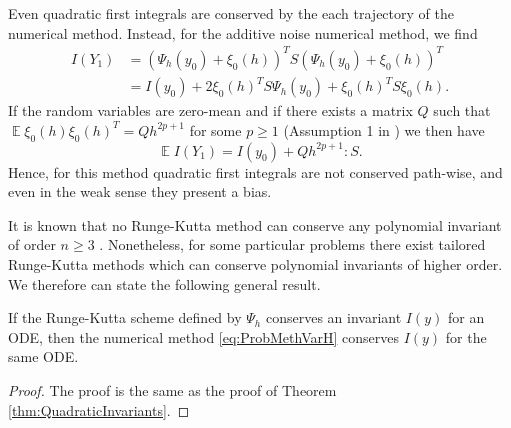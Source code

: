 \documentclass{siamart1116}
\numberwithin{theorem}{section}
\newcommand{\E}{\operatorname{\mathbb{E}}}
\begin{document}
\begin{remark}\label{rem:QuadraticInvariants} Even quadratic first integrals are conserved by the each trajectory of the numerical method. Instead, for the additive noise numerical method, we find
	\begin{equation}
	\begin{aligned}
		I(Y_1) &= (\Psi_h(y_0) + \xi_0(h))^T S (\Psi_h(y_0) + \xi_0(h))^T \\
		&= I(y_0) + 2\xi_0(h)^T S  \Psi_h(y_0) + \xi_0(h)^T S \xi_0(h).
	\end{aligned}
	\end{equation}
	If the random variables are zero-mean and if there exists a matrix $Q$ such that $\E\xi_0(h)\xi_0(h)^T = Qh^{2p + 1}$ for some $p \geq 1$ (Assumption 1 in \cite{CGS16}) we then have
	\begin{equation}
		\E I(Y_1) = I(y_0) + Q h^{2p + 1} : S.
	\end{equation}
	Hence, for this method quadratic first integrals are not conserved path-wise, and even in the weak sense they present a bias.
\end{remark}
It is known that no Runge-Kutta method can conserve any polynomial invariant of order $n \geq 3$ \cite{HLW06}. Nonetheless, for some particular problems there exist tailored Runge-Kutta methods which can conserve polynomial invariants of higher order. We therefore can state the following general result.
\begin{theorem}\label{thm:PolyInvariants} If the Runge-Kutta scheme defined by $\Psi_h$ conserves an invariant $I(y)$ for an ODE, then the numerical method \eqref{eq:ProbMethVarH} conserves $I(y)$ for the same ODE.
\end{theorem}
\begin{proof} The proof is the same as the proof of Theorem \ref{thm:QuadraticInvariants}.
\end{proof}
\end{document}
